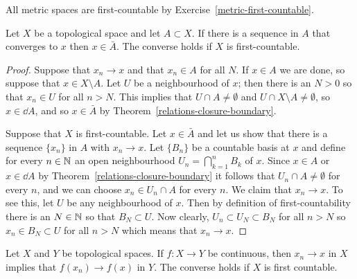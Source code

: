 \begin{example}
  All metric spaces are first-countable by Exercise~\ref{metric-first-countable}.
\end{example}
\begin{lem}
  \label{closure-convergence}
  Let $X$ be a topological space and let $A \subset X$. If there is a sequence in $A$ that converges to $x$ then $x \in \bar A$. The converse holds if $X$ is first-countable.
\end{lem}
\begin{proof}
  Suppose that $x_n \to x$ and that $x_n \in A$ for all $N$. If $x \in A$ we are done, so suppose that $x \in X \setminus A$. Let $U$ be a neighbourhood of $x$; then there is an $N > 0$ so that $x_n \in U$ for all $n > N$. This implies that $U \cap A \not= \emptyset$ and $U \cap X \setminus A \not= \emptyset$, so $x \in \dd A$, and so $x \in \bar A$ by Theorem~\ref{relations-closure-boundary}.
  
  Suppose that $X$ is first-countable. Let $x \in \bar A$ and let us show that there is a sequence $\{x_n\}$ in $A$ with $x_n \to x$. Let $\{B_n\}$ be a countable basis at $x$ and define for every $n \in \mathbb{N}$ an open neighbourhood $U_n = \bigcap_{k=1}^n B_k$ of $x$. Since $x \in A$ or $x \in \dd A$ by Theorem~\ref{relations-closure-boundary} it follows that $U_n \cap A \not= \emptyset$ for every $n$, and we can choose $x_n \in U_n \cap A$ for every $n$. We claim that $x_n \to x$. To see this, let $U$ be any neighbourhood of $x$. Then by definition of first-countability there is an $N \in \mathbb{N}$ so that $B_N \subset U$. Now clearly, $U_n \subset U_N \subset B_N$ for all $n > N$ so $x_n \in B_N \subset U$ for all $n > N$ which means that $x_n \to x$.
\end{proof}
\begin{thm}
  \label{sequential-continuity}
  Let $X$ and $Y$ be topological spaces. If $f : X \to Y$ be continuous, then $x_n \to x$ in $X$ implies that $f(x_n) \to f(x)$ in $Y$. The converse holds if $X$ is first countable.
\end{thm}

